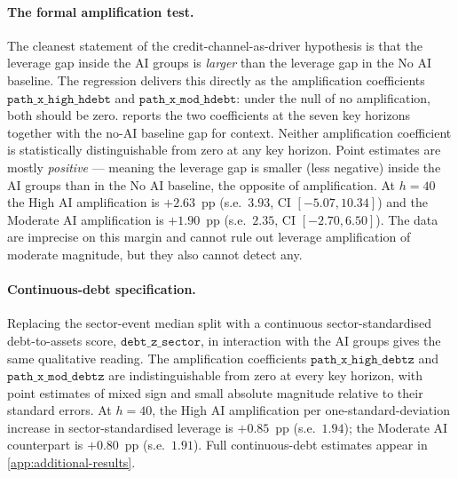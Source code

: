 \paragraph{The formal amplification test.} The cleanest statement of
the credit-channel-as-driver hypothesis is that the leverage gap
inside the AI groups is \emph{larger} than the leverage gap in the
No AI baseline. The regression delivers this directly as the
amplification coefficients $\texttt{path\_x\_high\_hdebt}$ and
$\texttt{path\_x\_mod\_hdebt}$: under the null of no amplification,
both should be zero.  reports the
two coefficients at the seven key horizons together with the no-AI
baseline gap for context. Neither amplification coefficient is
statistically distinguishable from zero at any key horizon. Point
estimates are mostly \emph{positive} --- meaning the leverage gap is
smaller (less negative) inside the AI groups than in the No AI
baseline, the opposite of amplification. At $h = 40$ the High AI
amplification is $+2.63$~pp (s.e.~$3.93$, CI $[-5.07, 10.34]$) and
the Moderate AI amplification is $+1.90$~pp (s.e.~$2.35$, CI
$[-2.70, 6.50]$). The data are imprecise on this margin and cannot
rule out leverage amplification of moderate magnitude, but they
also cannot detect any.
 
\begin{table}[htbp]
\centering\small
\caption[Leverage amplification by AI group: key-horizon estimates]{Leverage
amplification by AI group: key-horizon estimates}
\label{tab:debt_amplification_key}

\end{table}
 
\paragraph{Continuous-debt specification.} Replacing the sector-event
median split with a continuous sector-standardised debt-to-assets
score, $\texttt{debt\_z\_sector}$, in interaction with the AI groups
gives the same qualitative reading. The amplification coefficients
$\texttt{path\_x\_high\_debtz}$ and $\texttt{path\_x\_mod\_debtz}$
are indistinguishable from zero at every key horizon, with point
estimates of mixed sign and small absolute magnitude relative to
their standard errors. At $h = 40$, the High AI amplification per
one-standard-deviation increase in sector-standardised leverage is
$+0.85$~pp (s.e.~$1.94$); the Moderate AI counterpart is $+0.80$~pp
(s.e.~$1.91$). Full continuous-debt estimates appear in
\cref{app:additional-results}.
 
